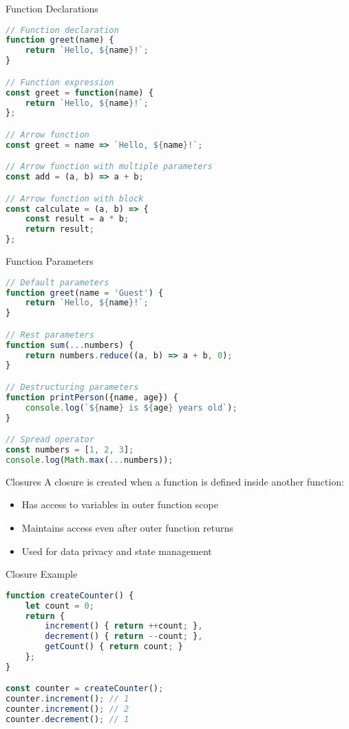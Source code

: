 \begin{KR}{Function Declarations}
\begin{lstlisting}[language=JavaScript, style=basesmol]
// Function declaration
function greet(name) {
    return `Hello, ${name}!`;
}

// Function expression
const greet = function(name) {
    return `Hello, ${name}!`;
};

// Arrow function
const greet = name => `Hello, ${name}!`;

// Arrow function with multiple parameters
const add = (a, b) => a + b;

// Arrow function with block
const calculate = (a, b) => {
    const result = a * b;
    return result;
};
\end{lstlisting}
\end{KR}

\begin{KR}{Function Parameters}
\begin{lstlisting}[language=JavaScript, style=basesmol]
// Default parameters
function greet(name = 'Guest') {
    return `Hello, ${name}!`;
}

// Rest parameters
function sum(...numbers) {
    return numbers.reduce((a, b) => a + b, 0);
}

// Destructuring parameters
function printPerson({name, age}) {
    console.log(`${name} is ${age} years old`);
}

// Spread operator
const numbers = [1, 2, 3];
console.log(Math.max(...numbers));
\end{lstlisting}
\end{KR}

\begin{concept}{Closures}
    A closure is created when a function is defined inside another function:
    \begin{itemize}
        \item Has access to variables in outer function scope
        \item Maintains access even after outer function returns
        \item Used for data privacy and state management
    \end{itemize}
\end{concept}

\begin{KR}{Closure Example}
\begin{lstlisting}[language=JavaScript, style=basesmol]
function createCounter() {
    let count = 0;
    return {
        increment() { return ++count; },
        decrement() { return --count; },
        getCount() { return count; }
    };
}

const counter = createCounter();
counter.increment(); // 1
counter.increment(); // 2
counter.decrement(); // 1
\end{lstlisting}
\end{KR}

